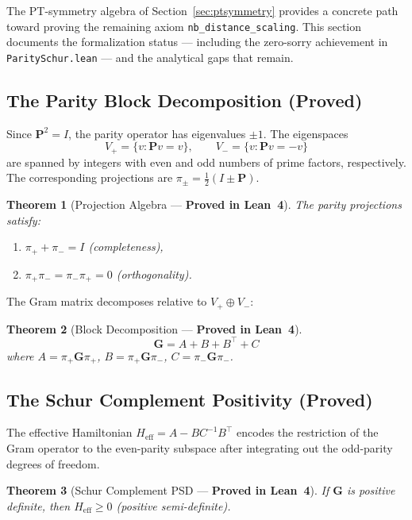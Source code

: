 \documentclass[11pt,a4paper]{article}
\newtheorem{theorem}{Theorem}[section]
\theoremstyle{definition}
\theoremstyle{remark}
\newcommand{\Gram}{\mathbf{G}}
\newcommand{\Parity}{\mathbf{P}}
\newcommand{\lean}[1]{\texttt{#1}}
\begin{document}
The PT-symmetry algebra of Section~\ref{sec:ptsymmetry} provides a
concrete path toward proving the remaining axiom
\lean{nb\_distance\_scaling}. This section documents the formalization
status --- including the zero-sorry achievement in
\texttt{ParitySchur.lean} --- and the analytical gaps that remain.

\subsection{The Parity Block Decomposition (Proved)}

Since $\Parity^2 = I$, the parity operator has eigenvalues $\pm 1$.
The eigenspaces
\[
  V_+ = \{v : \Parity v = v\}, \qquad V_- = \{v : \Parity v = -v\}
\]
are spanned by integers with even and odd numbers of prime factors,
respectively. The corresponding projections are
$\pi_\pm = \tfrac{1}{2}(I \pm \Parity)$.

\begin{theorem}[Projection Algebra --- \textbf{Proved in Lean~4}]
  The parity projections satisfy:
  \begin{enumerate}
    \item $\pi_+ + \pi_- = I$ (completeness),
    \item $\pi_+ \pi_- = \pi_- \pi_+ = 0$ (orthogonality).
  \end{enumerate}
\end{theorem}

The Gram matrix decomposes relative to $V_+ \oplus V_-$:
\begin{theorem}[Block Decomposition --- \textbf{Proved in Lean~4}]
\[
  \Gram = A + B + B^\top + C
\]
where $A = \pi_+ \Gram \pi_+$, $B = \pi_+ \Gram \pi_-$, $C = \pi_- \Gram \pi_-$.
\end{theorem}

\subsection{The Schur Complement Positivity (Proved)}

The effective Hamiltonian $H_{\mathrm{eff}} = A - BC^{-1}B^\top$ encodes
the restriction of the Gram operator to the even-parity subspace after
integrating out the odd-parity degrees of freedom.

\begin{theorem}[Schur Complement PSD --- \textbf{Proved in Lean~4}]
  If $\Gram$ is positive definite, then $H_{\mathrm{eff}} \geq 0$
  (positive semi-definite).
\end{theorem}
\end{document}
